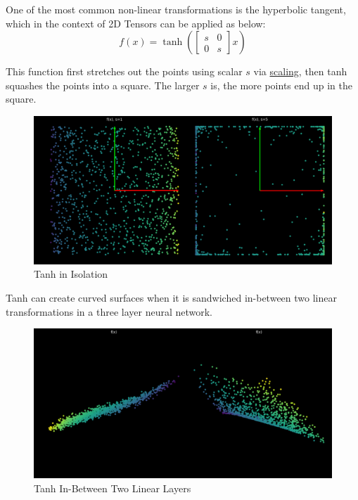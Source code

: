 One of the most common non-linear transformations is the hyperbolic tangent, which in the context of 2D Tensors can be applied as below:
\[f(x) = \tanh(
\begin{bmatrix}
s & 0\\
0 & s
\end{bmatrix}
x)\]

This function first stretches out the points using scalar $s$ via \hyperref[subsubsec:Scaling]{scaling}, then tanh squashes the points into a square.
The larger $s$ is, the more points end up in the square.

\begin{figure}[h!]
\begin{center}
\includegraphics{labs/01/images/tanh.png}
\end{center} 
\caption{Tanh in Isolation}
\label{fig:mon}
\end{figure}

Tanh can create curved surfaces when it is sandwiched in-between two linear transformations in a three layer neural network.

\begin{figure}[h!]
\begin{center}
\includegraphics{labs/01/images/tanh_sandwich.png}
\end{center} 
\caption{Tanh In-Between Two Linear Layers}
\label{fig:mon}
\end{figure}
